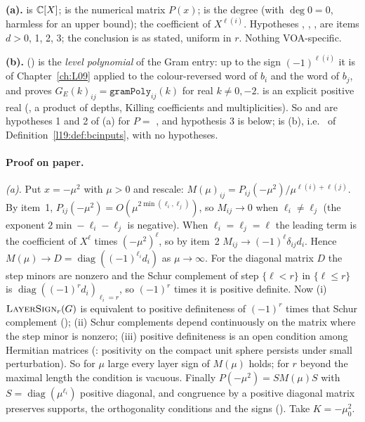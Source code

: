 \begin{dictionary}
\textbf{(a).}  is ${\mathbb{C}}[X]$;  is the numerical matrix $P(x)$;
 is the degree (with $\deg 0 = 0$, harmless for an upper bound);  the coefficient of
$X^{\ell(i)}$. Hypotheses , , ,  are items $d>0$, 1, 2, 3; the conclusion
is as stated, uniform in $r$. Nothing VOA-specific.

\textbf{(b).}  () is the \emph{level polynomial}
of the Gram entry: up to the sign $(-1)^{\ell(i)}$ it is  of Chapter~\ref{ch:L09} applied
to the colour-reversed word of $b_i$ and the word of $b_j$, and  proves
$G_E(k)_{ij} = \mathtt{gramPoly}_{ij}(k)$ for real $k\ne0,-2$.  is an explicit positive real
(, a product of depths, Killing coefficients and multiplicities). So
 and  are hypotheses 1 and 2 of (a) for $P = $
, and hypothesis 3 is  below;  is (b),
i.e.\  of Definition~\ref{l19:def:bcinputs}, with no hypotheses.
\end{dictionary}

\paragraph{Proof on paper.} \emph{(a).} Put $x = -\mu^2$ with $\mu>0$ and rescale:
$M(\mu)_{ij} = P_{ij}(-\mu^2)/\mu^{\ell(i)+\ell(j)}$. By item~1, $P_{ij}(-\mu^2) = O(\mu^{2\min(\ell_i,\ell_j)})$, so
$M_{ij}\to0$ when $\ell_i\ne\ell_j$ (the exponent $2\min-\ell_i-\ell_j$ is negative). When $\ell_i = \ell_j = \ell$ the
leading term is the coefficient of $X^\ell$ times $(-\mu^2)^\ell$, so by item~2 $M_{ij}\to(-1)^\ell\delta_{ij}d_i$.
Hence $M(\mu)\to D = \operatorname{diag}((-1)^{\ell_i}d_i)$ as $\mu\to\infty$. For the diagonal matrix $D$ the step
minors are nonzero and the Schur complement of step $\{\ell<r\}$ in $\{\ell\le r\}$ is $\operatorname{diag}((-1)^rd_i)_{\ell_i = r}$, so
$(-1)^r$ times it is positive definite. Now (i) $\textsc{LayerSign}_r(G)$ is equivalent to positive definiteness of
$(-1)^r$ times that Schur complement (); (ii) Schur complements depend continuously on
the matrix where the step minor is nonzero; (iii) positive definiteness is an open condition among Hermitian
matrices (: positivity on the compact unit sphere persists under small perturbation). So for
$\mu$ large every layer sign of $M(\mu)$ holds; for $r$ beyond the maximal length the condition is vacuous. Finally
$P(-\mu^2) = SM(\mu)S$ with $S = \operatorname{diag}(\mu^{\ell_i})$ positive diagonal, and congruence by a positive
diagonal matrix preserves supports, the orthogonality conditions and the signs (). Take
$K = -\mu_0^2$.

